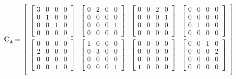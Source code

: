\documentclass[twocolumn,10pt]{asme2ej}
\begin{document}
\begin{equation}
    \bm{C_{\mu}} = \begin{bmatrix}
    \begin{bmatrix} 3 & 0 & 0 & 0 \\ 0 & 1 & 0 & 0 \\ 0 & 0 & 1 & 0 \\ 0 & 0 & 0 & 0 \end{bmatrix} &
    \begin{bmatrix} 0 & 2 & 0 & 0 \\ 0 & 0 & 0 & 0 \\ 0 & 0 & 0 & 1 \\ 0 & 0 & 0 & 0 \end{bmatrix} &
    \begin{bmatrix} 0 & 0 & 2 & 0 \\ 0 & 0 & 0 & 1 \\ 0 & 0 & 0 & 0 \\ 0 & 0 & 0 & 0 \end{bmatrix} &
    \begin{bmatrix}0 & 0 & 0 & 0 \\ 0 & 0 & 0 & 0 \\ 0 & 1 & 0 & 0 \\ 0 & 0 & 0 & 0 \end{bmatrix} \\
      \begin{bmatrix} 0 & 0 & 0 & 0 \\ 2 & 0 & 0 & 0 \\ 0 & 0 & 0 & 0 \\ 0 & 0 & 1 & 0 \end{bmatrix} &
      \begin{bmatrix} 1 & 0 & 0 & 0 \\ 0 & 3 & 0 & 0 \\ 0 & 0 & 0 & 0 \\ 0 & 0 & 0 & 1 \end{bmatrix} &
      \begin{bmatrix} 0 & 0 & 0 & 0 \\ 0 & 0 & 0 & 0 \\ 0 & 0 & 0 & 0 \\ 1 & 0 & 0 & 0 \end{bmatrix} &
      \begin{bmatrix}0 & 0 & 1 & 0 \\ 0 & 0 & 0 & 2 \\ 0 & 0 & 0 & 0 \\ 0 & 0 & 0 & 0 \end{bmatrix} \\

\end{bmatrix}
\end{equation}
\end{document}
